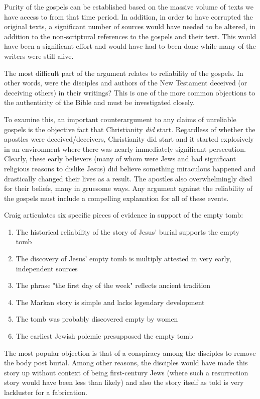 \documentclass[12pt]{turabian-researchpaper}
\begin{document}
Purity of the gospels can be established based on the massive volume of texts we have access to from that time period. In addition, in order to have corrupted the original texts, a significant number of sources would have needed to be altered, in addition to the non-scriptural references to the gospels and their text. This would have been a significant effort and would have had to been done while many of the writers were still alive.

The most difficult part of the argument relates to reliability of the gospels. In other words, were the disciples and authors of the New Testament deceived (or deceiving others) in their writings? This is one of the more common objections to the authenticity of the Bible and must be investigated closely.

To examine this, an important counterargument to any claims of unreliable gospels is the objective fact that Christianity \textit{did} start. Regardless of whether the apostles were deceived/deceivers, Christianity did start and it started explosively in an environment where there was nearly immediately significant persecution. Clearly, these early believers (many of whom were Jews and had significant religious reasons to dislike Jesus) did believe something miraculous happened and drastically changed their lives as a result. The apostles also overwhelmingly died for their beliefs, many in gruesome ways. Any argument against the reliability of the gospels must include a compelling explanation for all of these events.

Craig articulates six specific pieces of evidence in support of the empty tomb:\autocite[pg.361-369]{craig2008reasonable}

\begin{enumerate}
\item The historical reliability of the story of Jesus' burial supports the empty tomb
\item The discovery of Jesus' empty tomb is multiply attested in very early, independent sources
\item The phrase "the first day of the week" reflects ancient tradition
\item The Markan story is simple and lacks legendary development
\item The tomb was probably discovered empty by women
\item The earliest Jewish polemic presupposed the empty tomb
\end{enumerate}

The most popular objection is that of a conspiracy among the disciples to remove the body post burial. Among other reasons, the disciples would have made this story up without context of being first-century Jews (where such a resurrection story would have been less than likely) and also the story itself as told is very lackluster for a fabrication.
\end{document}

